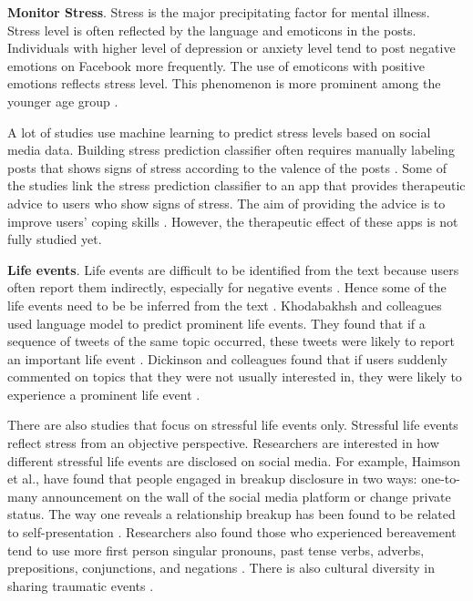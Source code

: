 \textbf{Monitor Stress}. Stress is the major precipitating factor for mental illness.  Stress level is often reflected by the language and emoticons in the posts. Individuals with higher level of depression or anxiety level tend to post negative emotions on Facebook more frequently. The use of emoticons with positive emotions reflects stress level. This phenomenon is more prominent among the younger age group \cite{settanni2015sharing}.

A lot of studies use machine learning to predict stress levels based on social media data. Building stress prediction classifier often requires manually labeling posts that shows signs of stress according to the valence of the posts \cite{thelwall2017tensistrength,mogadala2012twitter,lin2014user}. 
Some of the studies link the stress prediction classifier to an app that provides therapeutic advice to users who show signs of stress. The aim of providing the advice is to improve users' coping skills \cite{li2014helping}. However, the therapeutic effect of these apps is not fully studied yet.

\textbf{Life events}. Life events are difficult to be identified from the text because users often report them indirectly, especially for negative events \cite{bevan2015important}. Hence some of the life events need to be be inferred from the text \cite{khodabakhsh2018detecting,abe2018predicting}.  Khodabakhsh and colleagues used language model to predict prominent life events. They found that if a sequence of tweets of the same topic occurred, these tweets were likely to report an important life event \cite{khodabakhsh2018detecting}. Dickinson and colleagues found that if users suddenly commented on topics that they were not usually interested in, they were likely to experience a prominent life event \cite{dickinson2015identifying}.

There are also studies that focus on stressful life events only. Stressful life events reflect stress from an objective perspective. Researchers are interested in how different stressful life events are disclosed on social media. For example, Haimson et al., have found that people engaged in breakup disclosure in two ways: one-to-many announcement on the wall of the social media platform or change private status. The way one reveals a relationship breakup has been found to be related to self-presentation \cite{haimson2018relationship}. Researchers also found those who experienced bereavement tend to use more first person singular pronouns, past tense verbs, adverbs, prepositions, conjunctions, and negations \cite{brubaker2012grief}. There is also cultural diversity in sharing traumatic events \cite{freitag2011talking}. 

